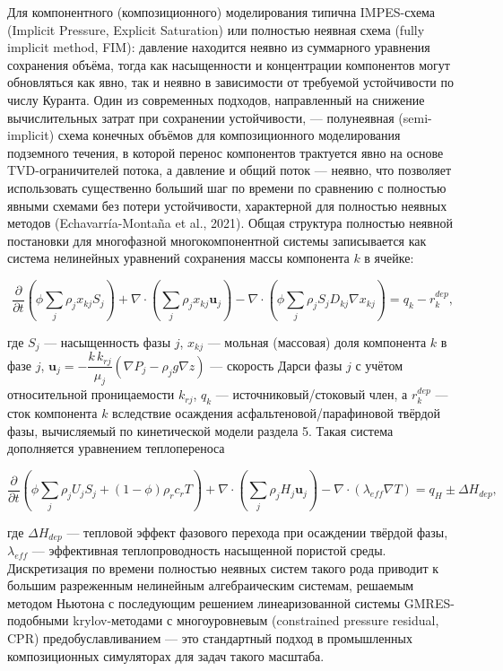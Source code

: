 \documentclass[11pt]{extarticle}
\begin{document}
Для компонентного (композиционного) моделирования типична IMPES-схема (Implicit Pressure, Explicit Saturation) или полностью неявная схема (fully implicit method, FIM): давление находится неявно из суммарного уравнения сохранения объёма, тогда как насыщенности и концентрации компонентов могут обновляться как явно, так и неявно в зависимости от требуемой устойчивости по числу Куранта. Один из современных подходов, направленный на снижение вычислительных затрат при сохранении устойчивости, --- полунеявная (semi-implicit) схема конечных объёмов для композиционного моделирования подземного течения, в которой перенос компонентов трактуется явно на основе TVD-ограничителей потока, а давление и общий поток --- неявно, что позволяет использовать существенно больший шаг по времени по сравнению с полностью явными схемами без потери устойчивости, характерной для полностью неявных методов (Echavarría-Montaña et al., 2021). Общая структура полностью неявной постановки для многофазной многокомпонентной системы записывается как система нелинейных уравнений сохранения массы компонента \(k\) в ячейке:

\[
\frac{\partial}{\partial t}\left(\phi \sum_{j} \rho_j x_{kj} S_j\right) + \nabla\cdot\left(\sum_j \rho_j x_{kj} \mathbf{u}_j\right) - \nabla\cdot\left(\phi \sum_j \rho_j S_j D_{kj}\nabla x_{kj}\right) = q_k - r_k^{dep},
\]

где \(S_j\) --- насыщенность фазы \(j\), \(x_{kj}\) --- мольная (массовая) доля компонента \(k\) в фазе \(j\), \(\mathbf{u}_j = -\dfrac{k\,k_{rj}}{\mu_j}(\nabla P_j - \rho_j g\nabla z)\) --- скорость Дарси фазы \(j\) с учётом относительной проницаемости \(k_{rj}\), \(q_k\) --- источниковый/стоковый член, а \(r_k^{dep}\) --- сток компонента \(k\) вследствие осаждения асфальтеновой/парафиновой твёрдой фазы, вычисляемый по кинетической модели раздела 5. Такая система дополняется уравнением теплопереноса

\[
\frac{\partial}{\partial t}\left(\phi\sum_j \rho_j U_j S_j + (1-\phi)\rho_r c_r T\right) + \nabla\cdot\left(\sum_j \rho_j H_j \mathbf{u}_j\right) - \nabla\cdot(\lambda_{eff}\nabla T) = q_H \pm \Delta H_{dep},
\]

где \(\Delta H_{dep}\) --- тепловой эффект фазового перехода при осаждении твёрдой фазы, \(\lambda_{eff}\) --- эффективная теплопроводность насыщенной пористой среды. Дискретизация по времени полностью неявных систем такого рода приводит к большим разреженным нелинейным алгебраическим системам, решаемым методом Ньютона с последующим решением линеаризованной системы GMRES-подобными krylov-методами с многоуровневым (constrained pressure residual, CPR) предобуславливанием --- это стандартный подход в промышленных композиционных симуляторах для задач такого масштаба.
\end{document}
